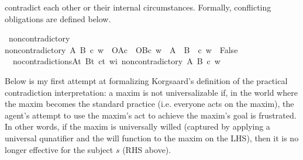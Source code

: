 \begin{isabellebody}
\begin{isamarkuptext}
contradict each other or their internal circumstances. Formally, conflicting obligations are defined below.%
\end{isamarkuptext}\isamarkuptrue%
\isamarkupfalse%
\ non{\isacharunderscore}contradictory\ \ \isanewline
{\isachardoublequoteopen}non{\isacharunderscore}contradictory\ A\ B\ c\ w\ {\isasymequiv}\ {\isacharparenleft}{\isacharparenleft}O{\isacharbraceleft}A{\isacharbar}c{\isacharbraceright}\ \isactrlbold {\isasymand}\ O{\isacharbraceleft}B{\isacharbar}c{\isacharbraceright}{\isacharparenright}\ w{\isacharparenright}\ {\isasymlongrightarrow}\ {\isasymnot}{\isacharparenleft}{\isacharparenleft}A\ \isactrlbold {\isasymand}\ {\isacharparenleft}B\ \isactrlbold {\isasymand}\ c{\isacharparenright}{\isacharparenright}\ w\ {\isasymlongrightarrow}\ False{\isacharparenright}{\isachardoublequoteclose}\isanewline
%
\isanewline
\isanewline
{}\isamarkupfalse%
\ \ no{\isacharunderscore}contradictions{\isacharcolon}{\isachardoublequoteopen}{\isasymforall}A{\isacharcolon}{\isacharcolon}t{\isachardot}\ {\isasymforall}B{\isacharcolon}{\isacharcolon}t{\isachardot}\ {\isasymforall}c{\isacharcolon}{\isacharcolon}t{\isachardot}\ {\isasymforall}w{\isacharcolon}{\isacharcolon}i{\isachardot}\ non{\isacharunderscore}contradictory\ A\ B\ c\ w{\isachardoublequoteclose}\isanewline
%
%
\isadelimdocument
%
\endisadelimdocument
%
\isatagdocument
%
\isamarkuptrue%
%
\endisatagdocument
{\isafolddocument}%
%
\isadelimdocument
%
\endisadelimdocument
%
\begin{isamarkuptext}%
Below is my first attempt at formalizing Korgsaard's definition of the practical contradiction
interpretation:  a maxim is not universalizable 
if, in the world where the maxim becomes the standard practice (i.e. everyone acts on the maxim), the
agent's attempt to use the maxim's act to achieve the maxim's goal is frustrated. In other words, if 
the maxim is universally willed (captured by applying a universal qunatifier and the will function 
to the maxim on the LHS), then it is no longer effective for the subject $s$ (RHS above).%

\end{isamarkuptext}
\end{isabellebody}
